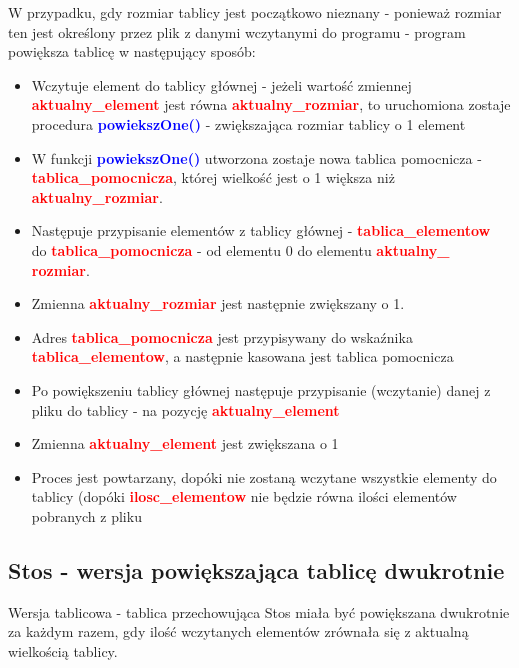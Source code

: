 \documentclass[12pt,a4paper,oneside]{article}
\begin{document}
W przypadku, gdy rozmiar tablicy jest początkowo nieznany - ponieważ rozmiar ten jest określony przez plik z danymi wczytanymi do programu - program powiększa tablicę w następujący sposób:
\begin{itemize}
	\item Wczytuje element do tablicy głównej - jeżeli wartość zmiennej \textbf{\textcolor{red}{aktualny\_element}} jest równa \textbf{\textcolor{red}{aktualny\_rozmiar}}, to uruchomiona zostaje procedura \textbf{\textcolor{blue}{powiekszOne()}} - zwiększająca rozmiar tablicy o 1 element
	\item W funkcji \textbf{\textcolor{blue}{powiekszOne()}} utworzona zostaje nowa tablica pomocnicza - \\ \textbf{\textcolor{red}{tablica\_pomocnicza}}, której wielkość jest o 1 większa niż \textbf{\textcolor{red}{aktualny\_rozmiar}}. 
	\item Następuje przypisanie elementów z tablicy głównej - \textbf{\textcolor{red}{tablica\_elementow}}\\ do \textbf{\textcolor{red}{tablica\_pomocnicza}} - od elementu 0 do elementu \textbf{\textcolor{red}{aktualny\_ rozmiar}}.
	\item Zmienna \textbf{\textcolor{red}{aktualny\_rozmiar}} jest następnie zwiększany o 1.
	\item Adres \textbf{\textcolor{red}{tablica\_pomocnicza}} jest przypisywany do wskaźnika \textbf{\textcolor{red}{tablica\_elementow}}, a następnie kasowana jest tablica pomocnicza
	\item Po powiększeniu tablicy głównej następuje przypisanie (wczytanie) danej z pliku do tablicy - na pozycję \textbf{\textcolor{red}{aktualny\_element}}
	\item Zmienna \textbf{\textcolor{red}{aktualny\_element}} jest zwiększana o 1
	\item Proces jest powtarzany, dopóki nie zostaną wczytane wszystkie elementy do tablicy (dopóki \textbf{\textcolor{red}{ilosc\_elementow}} nie będzie równa ilości elementów pobranych z pliku
\end{itemize}

\subsection{Stos - wersja powiększająca tablicę dwukrotnie}
Wersja tablicowa - tablica przechowująca Stos miała być powiększana dwukrotnie za każdym razem, gdy ilość wczytanych elementów zrównała się z aktualną wielkością tablicy.
\end{document}
